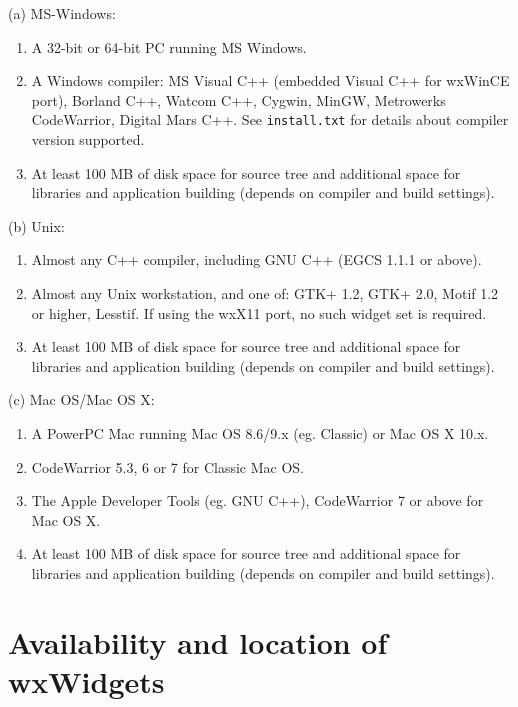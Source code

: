 (a) MS-Windows:

\begin{enumerate}\itemsep=0pt
\item A 32-bit or 64-bit PC running MS Windows.
\item A Windows compiler: MS Visual C++ (embedded Visual C++ for wxWinCE
port), Borland C++, Watcom C++, Cygwin, MinGW, Metrowerks CodeWarrior,
Digital Mars C++. See {\tt install.txt} for details about compiler 
version supported.
\item At least 100 MB of disk space for source tree and additional space for 
libraries and application building (depends on compiler and build settings).
\end{enumerate}

(b) Unix:

\begin{enumerate}\itemsep=0pt
\item Almost any C++ compiler, including GNU C++ (EGCS 1.1.1 or above).
\item Almost any Unix workstation, and one of: GTK+ 1.2, GTK+ 2.0, Motif 1.2 or higher, Lesstif.
If using the wxX11 port, no such widget set is required.
\item At least 100 MB of disk space for source tree and additional space for 
libraries and application building (depends on compiler and build settings).
\end{enumerate}

(c) Mac OS/Mac OS X:

\begin{enumerate}\itemsep=0pt
\item A PowerPC Mac running Mac OS 8.6/9.x (eg. Classic) or Mac OS X 10.x.
\item CodeWarrior 5.3, 6 or 7 for Classic Mac OS.
\item The Apple Developer Tools (eg. GNU C++), CodeWarrior 7 or above for Mac OS X.
\item At least 100 MB of disk space for source tree and additional space for 
libraries and application building (depends on compiler and build settings).
\end{enumerate}

\section{Availability and location of wxWidgets}\label{where}


